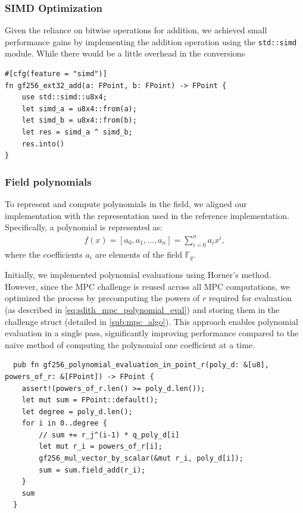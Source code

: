 \documentclass[11pt]{report}
\theoremstyle{definition}
\theoremstyle{plain}
\begin{document}
\subsubsection{SIMD Optimization}
Given the reliance on bitwise operations for addition, we achieved small performance gains by implementing the addition operation using the \texttt{std::simd} module. While there would be a little overhead in the conversions

\begin{verbatim}
#[cfg(feature = "simd")]
fn gf256_ext32_add(a: FPoint, b: FPoint) -> FPoint {
    use std::simd::u8x4;
    let simd_a = u8x4::from(a);
    let simd_b = u8x4::from(b);
    let res = simd_a ^ simd_b;
    res.into()
}
\end{verbatim}

\subsubsection{Field polynomials}\label{sub:field_polynomials}
To represent and compute polynomials in the field, we aligned our implementation with the representation used in the reference implementation. Specifically, a polynomial is represented as:
\begin{align*}
  f(x) = [a_0, a_1, \dots, a_n] = \sum_{i=0}^{n} a_i x^i,
\end{align*}
where the coefficients $a_i$ are elements of the field $\mathbb{F}_{q}$.

Initially, we implemented polynomial evaluations using Horner's method. However, since the MPC challenge is reused across all MPC computations, we optimized the process by precomputing the powers of $r$ required for evaluation (as described in \autoref{eq:sdith_mpc_polynomial_eval}) and storing them in the challenge struct (detailed in \autoref{sub:mpc_algo}). This approach enables polynomial evaluation in a single pass, significantly improving performance compared to the naive method of computing the polynomial one coefficient at a time.

\begin{verbatim}
  pub fn gf256_polynomial_evaluation_in_point_r(poly_d: &[u8], powers_of_r: &[FPoint]) -> FPoint {
    assert!(powers_of_r.len() >= poly_d.len());
    let mut sum = FPoint::default();
    let degree = poly_d.len();
    for i in 0..degree {
        // sum += r_j^(i-1) * q_poly_d[i]
        let mut r_i = powers_of_r[i];
        gf256_mul_vector_by_scalar(&mut r_i, poly_d[i]);
        sum = sum.field_add(r_i);
    }
    sum
  }
\end{verbatim}
\end{document}
